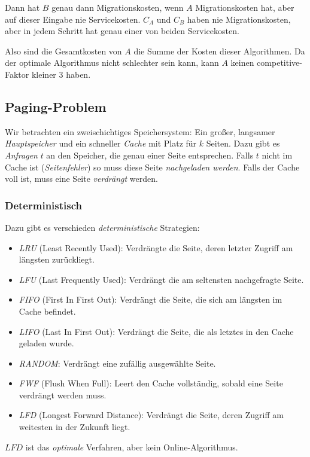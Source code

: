 \documentclass{panikzettel}
\begin{document}
Dann hat $B$ genau dann Migrationskosten, wenn $A$ Migrationskosten hat, aber auf dieser Eingabe nie Servicekosten. $C_A$ und $C_B$ haben nie Migrationskosten, aber in jedem Schritt hat genau einer von beiden Servicekosten.

Also sind die Gesamtkosten von $A$ die Summe der Kosten dieser Algorithmen. Da der optimale Algorithmus nicht schlechter sein kann, kann $A$ keinen competitive-Faktor kleiner $3$ haben.

\subsection{Paging-Problem}
Wir betrachten ein zweischichtiges Speichersystem: Ein großer, langsamer \emph{Hauptspeicher} und ein schneller \emph{Cache} mit Platz für $k$ Seiten. Dazu gibt es \emph{Anfragen} $t$ an den Speicher, die genau einer Seite entsprechen. Falls $t$ nicht im Cache ist (\textit{Seitenfehler}) so muss diese Seite \emph{nachgeladen werden}. Falls der Cache voll ist, muss eine Seite \emph{verdrängt} werden.

\subsubsection{Deterministisch}
Dazu gibt es verschieden \emph{deterministische} Strategien:
\begin{itemize}
    \item \textit{LRU} (Least Recently Used): Verdrängte die Seite, deren letzter Zugriff am längsten zurückliegt.
    \item \textit{LFU} (Last Frequently Used): Verdrängt die am seltensten nachgefragte Seite.
    \item \textit{FIFO} (First In First Out): Verdrängt die Seite, die sich am längsten im Cache befindet.
    \item \textit{LIFO} (Last In First Out): Verdrängt die Seite, die als letztes in den Cache geladen wurde.
    \item \textit{RANDOM}: Verdrängt eine zufällig ausgewählte Seite.
    \item \textit{FWF} (Flush When Full): Leert den Cache vollständig, sobald eine Seite verdrängt werden muss.
    \item \textit{LFD} (Longest Forward Distance): Verdrängt die Seite, deren Zugriff am weitesten in der Zukunft liegt.
\end{itemize}
$\textit{LFD}$ ist das \emph{optimale} Verfahren, aber kein Online-Algorithmus.
\end{document}
